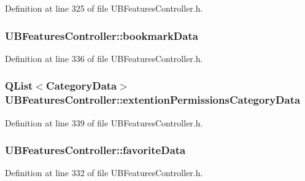 Definition at line 325 of file U\-B\-Features\-Controller.\-h.

\hypertarget{class_u_b_features_controller_aade4e1f1ad502444c2ebb3619bed1d17}{
\subsubsection[{bookmark\-Data}]{ U\-B\-Features\-Controller\-::bookmark\-Data}}\label{d8/d33/class_u_b_features_controller_aade4e1f1ad502444c2ebb3619bed1d17}


Definition at line 336 of file U\-B\-Features\-Controller.\-h.

\hypertarget{class_u_b_features_controller_a71500c59720c4ce5778bc8cf3bf04510}{
\subsubsection[{extention\-Permissions\-Category\-Data}]{\setlength{\rightskip}{0pt plus 5cm}Q\-List$<${\bf Category\-Data}$>$ U\-B\-Features\-Controller\-::extention\-Permissions\-Category\-Data}}\label{d8/d33/class_u_b_features_controller_a71500c59720c4ce5778bc8cf3bf04510}


Definition at line 339 of file U\-B\-Features\-Controller.\-h.

\hypertarget{class_u_b_features_controller_a252e15cb9fd4a8957f690451517f19d8}{
\subsubsection[{favorite\-Data}]{ U\-B\-Features\-Controller\-::favorite\-Data}}\label{d8/d33/class_u_b_features_controller_a252e15cb9fd4a8957f690451517f19d8}


Definition at line 332 of file U\-B\-Features\-Controller.\-h.

